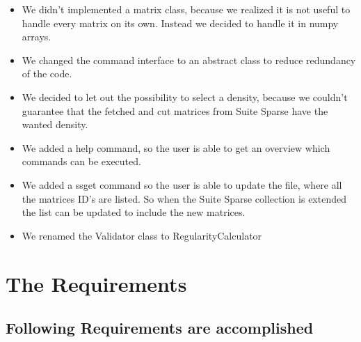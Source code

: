 \documentclass[parskip=full]{scrartcl}
\begin{document}
\begin{itemize}

\item We didn't implemented a matrix class, because we realized it is not useful to handle every matrix on its own. 
Instead we decided to handle it in numpy arrays.

\item We changed the command interface to an abstract class to reduce redundancy of the code.

\item We decided to let out the possibility to select a density, because we couldn't guarantee that the fetched and cut matrices from \gls{Suite Sparse} have the wanted density.

\item We added a help command, so the user is able to get an overview which commands can be executed.

\item We added a \gls{ssget} command so the user is able to update the file, where all the matrices ID's are listed.
So when the \gls{Suite Sparse} collection is extended the list can be updated to include the new matrices. 

\item We renamed the Validator class to RegularityCalculator
\end{itemize}


\section{The Requirements}
\subsection{Following Requirements are accomplished}
\end{document}
